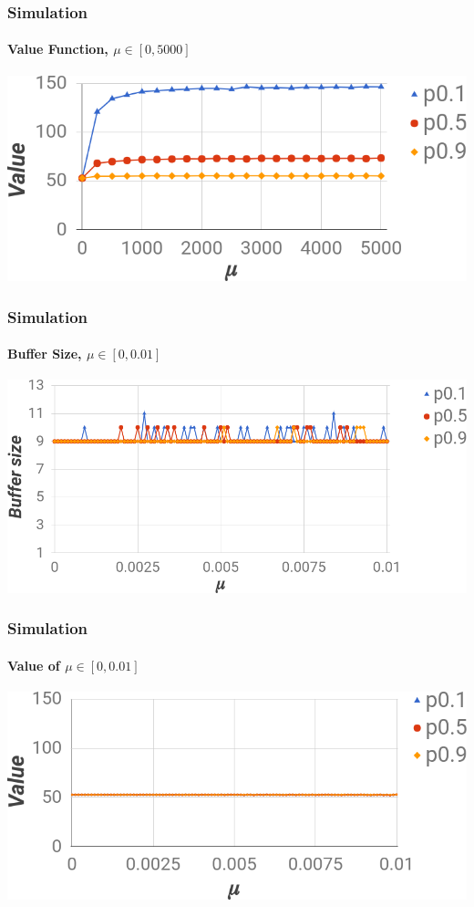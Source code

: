 \documentclass{beamer}
\begin{document}
\begin{frame}
  \frametitle{Simulation}
  \framesubtitle{Value Function, $\mu \in [0,5000]$}

  \begin{center}
    \includegraphics[width=1.0\textwidth]{pictures/vsim0-5000.png}
  \end{center}

\end{frame}

\begin{frame}
  \frametitle{Simulation}
  \framesubtitle{Buffer Size, $\mu \in [0,0.01]$}  
  \begin{center}
    \includegraphics[width=1.0\textwidth]{pictures/bsim0-001.png}
  \end{center}

\end{frame}

\begin{frame}
 \frametitle{Simulation}
  \framesubtitle{Value of $\mu \in [0,0.01]$}
  \begin{center}
    \includegraphics[width=1.0\textwidth]{pictures/vsim0-001.png}
  \end{center}

\end{frame}
\end{document}
